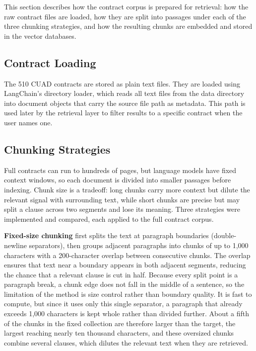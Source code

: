 This section describes how the contract corpus is prepared for retrieval: how the raw contract files are loaded, how they are split into passages under each of the three chunking strategies, and how the resulting chunks are embedded and stored in the vector databases.

\subsection{Contract Loading}

The 510 CUAD contracts are stored as plain text files. They are loaded using
LangChain's directory loader, which reads all text files from the data directory into
document objects that carry the source file path as metadata. This path is used later
by the retrieval layer to filter results to a specific contract when the user names one.

\subsection{Chunking Strategies}

Full contracts can run to hundreds of pages, but language models have fixed context windows, so each document is divided into smaller passages before indexing. Chunk size is a tradeoff: long chunks carry more context but dilute the relevant signal with surrounding text, while short chunks are precise but may split a clause across two segments and lose its meaning. Three strategies were implemented and compared, each applied to the full contract corpus.

\textbf{Fixed-size chunking} first splits the text at paragraph boundaries (double-newline separators), then groups adjacent paragraphs into chunks of up to 1,000 characters with a 200-character overlap between consecutive chunks. The overlap ensures that text near a boundary appears in both adjacent segments, reducing the chance that a relevant clause is cut in half. Because every split point is a paragraph break, a chunk edge does not fall in the middle of a sentence, so the limitation of the method is size control rather than boundary quality. It is fast to compute, but since it uses only this single separator, a paragraph that already exceeds 1,000 characters is kept whole rather than divided further. About a fifth of the chunks in the fixed collection are therefore larger than the target, the largest reaching nearly ten thousand characters, and these oversized chunks combine several clauses, which dilutes the relevant text when they are retrieved.


